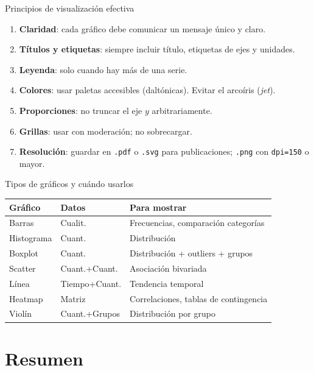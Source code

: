 \documentclass[aspectratio=169]{beamer}
\begin{document}
\begin{frame}{Principios de visualización efectiva}
  \begin{enumerate}
    \item \textbf{Claridad}: cada gráfico debe comunicar un mensaje único y claro.
    \item \textbf{Títulos y etiquetas}: siempre incluir título, etiquetas de ejes y unidades.
    \item \textbf{Leyenda}: solo cuando hay más de una serie.
    \item \textbf{Colores}: usar paletas accesibles (daltónicas). Evitar el arcoíris (\textit{jet}).
    \item \textbf{Proporciones}: no truncar el eje $y$ arbitrariamente.
    \item \textbf{Grillas}: usar con moderación; no sobrecargar.
    \item \textbf{Resolución}: guardar en \texttt{.pdf} o \texttt{.svg} para publicaciones; \texttt{.png} con \texttt{dpi=150} o mayor.
  \end{enumerate}
\end{frame}

\begin{frame}{Tipos de gráficos y cuándo usarlos}
  \begin{center}
    \begin{tabular}{lll}
      \toprule
      \textbf{Gráfico} & \textbf{Datos} & \textbf{Para mostrar} \\
      \midrule
      Barras & Cualit. & Frecuencias, comparación categorías \\
      Histograma & Cuant. & Distribución \\
      Boxplot & Cuant. & Distribución + outliers + grupos \\
      Scatter & Cuant.+Cuant. & Asociación bivariada \\
      Línea & Tiempo+Cuant. & Tendencia temporal \\
      Heatmap & Matriz & Correlaciones, tablas de contingencia \\
      Violín & Cuant.+Grupos & Distribución por grupo \\
      \bottomrule
    \end{tabular}
  \end{center}
\end{frame}

\section{Resumen}
\end{document}
